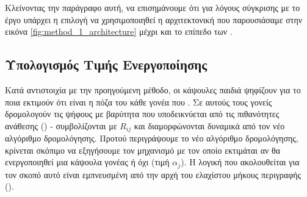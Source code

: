 Κλείνοντας την παράγραφο αυτή, να επισημάνουμε ότι για λόγους σύγκρισης με το έργο \cite{sabour2017dynamic} υπάρχει η επιλογή να χρησιμοποιηθεί η αρχιτεκτονική που παρουσιάσαμε στην εικόνα \ref{fig:method_1_architecture} μέχρι και το επίπεδο των .

\subsection{Υπολογισμός Τιμής Ενεργοποίησης}

Κατά αντιστοιχία με την προηγούμενη μέθοδο, οι κάψουλες παιδιά ψηφίζουν για το ποια εκτιμούν ότι είναι η πόζα του κάθε γονέα που . Σε αυτούς τους γονείς δρομολογούν τις ψήφους με βαρύτητα που υποδεικνύεται από τις πιθανότητες ανάθεσης () - συμβολίζονται με $R_{ij}$ και διαμορφώνονται δυναμικά από τον νέο αλγόριθμο δρομολόγησης. Προτού περιγράψουμε το νέο αλγόριθμο δρομολόγησης, κρίνεται σκόπιμο να εξηγήσουμε τον μηχανισμό με τον οποίο εκτιμάται αν θα ενεργοποιηθεί μια κάψουλα γονέας ή όχι (τιμή $\alpha_j$). Η λογική που ακολουθείται για τον σκοπό αυτό είναι εμπνευσμένη από την αρχή του ελαχίστου μήκους περιγραφής ().\par

